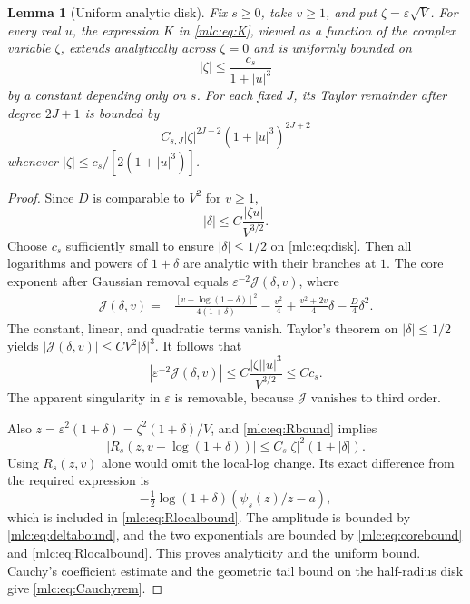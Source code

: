 \documentclass[11pt]{article}
\newtheorem{lemma}[theorem]{Lemma}
\theoremstyle{remark}\newtheorem{remark}[theorem]{Remark}
\newcommand{\eps}{\varepsilon}
\begin{document}
\begin{lemma}[Uniform analytic disk]\label{mlc:lem:disk}
Fix $s\ge0$, take $v\ge1$, and put $\zeta=\eps\sqrt V$. For every real $u$, the expression $K$ in \eqref{mlc:eq:K}, viewed as a function of the complex variable $\zeta$, extends analytically across $\zeta=0$ and is uniformly bounded on
\begin{equation}\label{mlc:eq:disk}
 |\zeta|\le\frac{c_s}{1+|u|^3}
\end{equation}
by a constant depending only on $s$. For each fixed $J$, its Taylor remainder after degree $2J+1$ is bounded by
\begin{equation}\label{mlc:eq:Cauchyrem}
 C_{s,J}|\zeta|^{2J+2}(1+|u|^3)^{2J+2}
\end{equation}
whenever $|\zeta|\le c_s/[2(1+|u|^3)]$.
\end{lemma}
\begin{proof}
Since $D$ is comparable to $V^2$ for $v\ge1$,
\begin{equation}\label{mlc:eq:deltabound}
 |\delta|\le C\frac{|\zeta u|}{V^{3/2}}.
\end{equation}
Choose $c_s$ sufficiently small to ensure $|\delta|\le1/2$ on \eqref{mlc:eq:disk}. Then all logarithms and powers of $1+\delta$ are analytic with their branches at $1$. The core exponent after Gaussian removal equals $\eps^{-2}\mathcal J(\delta,v)$, where
\begin{align}
 \mathcal J(\delta,v)={}&
 \frac{[v-\log(1+\delta)]^2}{4(1+\delta)}-\frac{v^2}4
       +\frac{v^2+2v}4\delta-\frac D4\delta^2.
 \label{mlc:eq:coreJ}
\end{align}
The constant, linear, and quadratic terms vanish. Taylor's theorem on $|\delta|\le1/2$ yields $|\mathcal J(\delta,v)|\le C V^2|\delta|^3$. It follows that
\begin{equation}\label{mlc:eq:corebound}
 |\eps^{-2}\mathcal J(\delta,v)|
   \le C\frac{|\zeta||u|^3}{V^{3/2}}\le Cc_s.
\end{equation}
The apparent singularity in $\eps$ is removable, because $\mathcal J$ vanishes to third order.

Also $z=\eps^2(1+\delta)=\zeta^2(1+\delta)/V$, and \eqref{mlc:eq:Rbound} implies
\begin{equation}\label{mlc:eq:Rlocalbound}
 |R_s(z,v-\log(1+\delta))|
       \le C_s|\zeta|^2(1+|\delta|).
\end{equation}
Using $R_s(z,v)$ alone would omit the local-log change. Its exact difference from the required expression is
\[
 -\tfrac12\log(1+\delta)\left(\psi_s(z)/z-a\right),
\]
which is included in \eqref{mlc:eq:Rlocalbound}. The amplitude is bounded by \eqref{mlc:eq:deltabound}, and the two exponentials are bounded by \eqref{mlc:eq:corebound} and \eqref{mlc:eq:Rlocalbound}. This proves analyticity and the uniform bound. Cauchy's coefficient estimate and the geometric tail bound on the half-radius disk give \eqref{mlc:eq:Cauchyrem}.
\end{proof}
\end{document}
